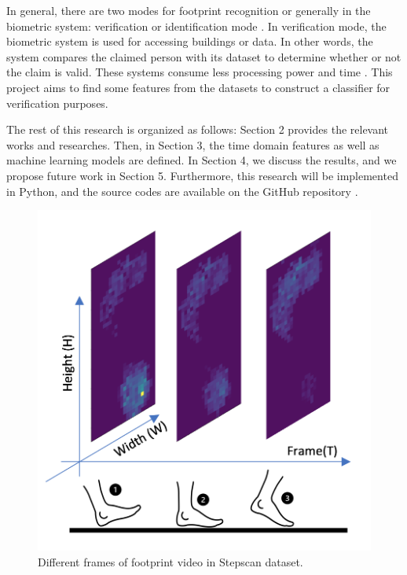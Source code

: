  

In general, there are two modes for footprint recognition or generally in the biometric system: verification or identification mode \cite{Jain2004AnRecognition}. In verification mode, the biometric system is used for accessing buildings or data. In other words, the system compares the claimed person with its dataset to determine whether or not the claim is valid. These systems consume less processing power and time \cite{Jain2004AnRecognition}. This project aims to find some features from the datasets to construct a classifier for verification purposes. 


 

The rest of this research is organized as follows: Section 2 provides the relevant works and researches. Then, in Section 3, the time domain features as well as machine learning models are defined. In Section 4, we discuss the results, and we propose future work in Section 5.
Furthermore, this research will be implemented in Python, and the source codes are available on the GitHub repository \cite{SKazemii/EE6563}. 

\begin{figure}
    \centering
    \begin{minipage}[b]{.5\textwidth}
        \includegraphics[width=\textwidth]{figures/project/frame2.png}
    \end{minipage}
    \caption{Different frames of footprint video in Stepscan dataset.}
    \label{fig:Stepscan_dataset}
\end{figure}


